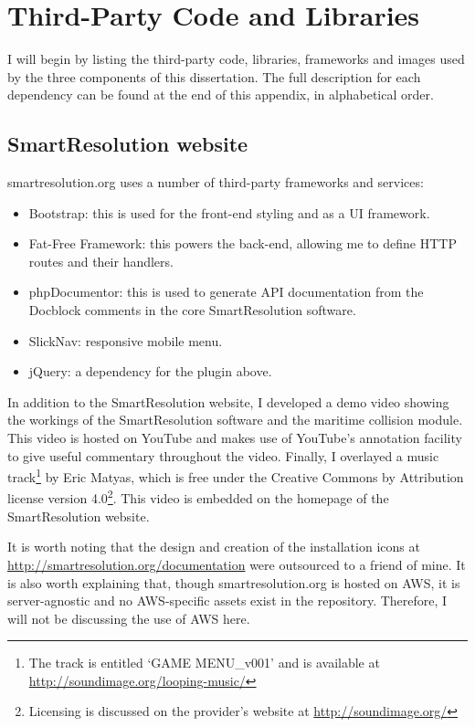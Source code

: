 \chapter{Third-Party Code and Libraries}

I will begin by listing the third-party code, libraries, frameworks and images used by the three components of this dissertation. The full description for each dependency can be found at the end of this appendix, in alphabetical order.

\section{SmartResolution website}

smartresolution.org uses a number of third-party frameworks and services:

\begin{itemize}
\item Bootstrap: this is used for the front-end styling and as a UI framework.
\item Fat-Free Framework: this powers the back-end, allowing me to define HTTP routes and their handlers.
\item phpDocumentor: this is used to generate API documentation from the Docblock comments in the core SmartResolution software.
\item SlickNav: responsive mobile menu.
\item jQuery: a dependency for the plugin above.
\end{itemize}

In addition to the SmartResolution website, I developed a demo video showing the workings of the SmartResolution software and the maritime collision module. This video is hosted on YouTube and makes use of YouTube's annotation facility to give useful commentary throughout the video. Finally, I overlayed a music track\footnote{The track is entitled `GAME MENU\_v001' and is available at \url{http://soundimage.org/looping-music/}} by Eric Matyas, which is free under the Creative Commons by Attribution license version 4.0\footnote{Licensing is discussed on the provider's website at \url{http://soundimage.org/}}. This video is embedded on the homepage of the SmartResolution website.

It is worth noting that the design and creation of the installation icons at \url{http://smartresolution.org/documentation} were outsourced to a friend of mine. It is also worth explaining that, though smartresolution.org is hosted on AWS, it is server-agnostic and no AWS-specific assets exist in the repository. Therefore, I will not be discussing the use of AWS here.

